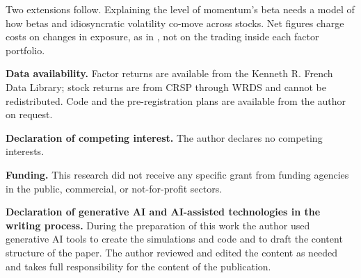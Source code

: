 \documentclass[11pt]{article}
\begin{document}
Two extensions follow. Explaining the level of momentum's beta needs a model of how betas and idiosyncratic volatility co-move across stocks. Net figures charge costs on changes in exposure, as in \citet{moreira2017}, not on the trading inside each factor portfolio.

\bigskip
\noindent\textbf{Data availability.} Factor returns are available from the Kenneth R. French Data Library; stock returns are from CRSP through WRDS and cannot be redistributed. Code and the pre-registration plans are available from the author on request.

\noindent\textbf{Declaration of competing interest.} The author declares no competing interests.

\noindent\textbf{Funding.} This research did not receive any specific grant from funding agencies in the public, commercial, or not-for-profit sectors.

\noindent\textbf{Declaration of generative AI and AI-assisted technologies in the writing process.} During the preparation of this work the author used generative AI tools to create the simulations and code and to draft the content structure of the paper. The author reviewed and edited the content as needed and takes full responsibility for the content of the publication.
\end{document}
